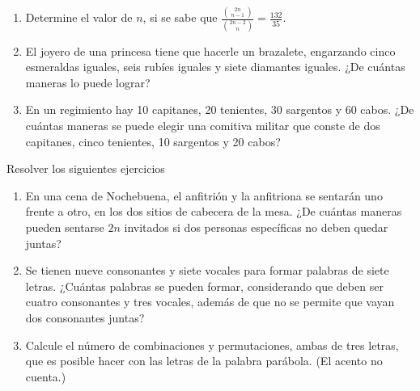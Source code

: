 \begin{Ejer}
\begin{enumerate}
\item Determine el valor de $n$, si se sabe que $\frac{\binom{2n}{\,n-1\,}}{\binom{2n-2}{\,n\,}}=\frac{132}{35}$.

\item El joyero de una princesa tiene que hacerle un brazalete, engarzando cinco esmeraldas iguales, seis rub\'ies iguales y siete diamantes iguales. ¿De cu\'antas maneras lo puede lograr?

\item En un regimiento hay 10 capitanes, 20 tenientes, 30 sargentos y 60 cabos. ¿De cu\'antas maneras se puede elegir una comitiva militar que conste de dos capitanes, cinco tenientes, 10 sargentos y 20 cabos?
\end{enumerate}
\end{Ejer}

\begin{Ejer} Resolver los siguientes ejercicios

\begin{enumerate}

\item En una cena de Nochebuena, el anfitri\'on y la anfitriona se sentar\'an uno frente a otro, en los dos sitios de cabecera de la mesa. ¿De cu\'antas maneras pueden sentarse $2n$ invitados si dos personas espec\'ificas no deben quedar juntas?

\item Se tienen nueve consonantes y siete vocales para formar palabras de siete letras. ¿Cu\'antas palabras se pueden formar, considerando que deben ser cuatro consonantes y tres vocales, adem\'as de que no se permite que vayan dos consonantes juntas?


\item Calcule el n\'umero de combinaciones y permutaciones, ambas de tres letras, que es posible hacer con las letras de la palabra par\'abola. (El acento no cuenta.)



\end{enumerate}
\end{Ejer}
